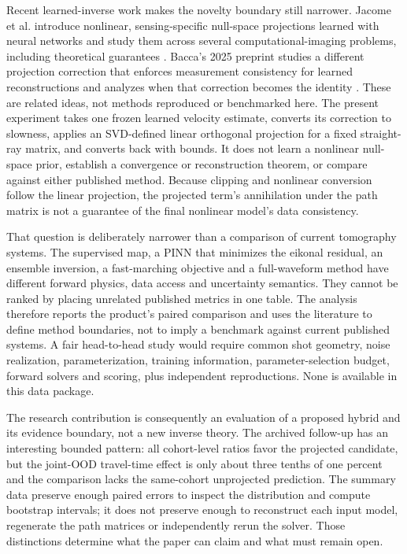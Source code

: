 \documentclass[11pt]{article}
\begin{document}
Recent learned-inverse work makes the novelty boundary still narrower. Jacome et al. introduce nonlinear, sensing-specific null-space projections learned with neural networks and study them across several computational-imaging problems, including theoretical guarantees \cite{jacome_npn_2025}. Bacca's 2025 preprint studies a different projection correction that enforces measurement consistency for learned reconstructions and analyzes when that correction becomes the identity \cite{bacca_projection_2025}. These are related ideas, not methods reproduced or benchmarked here. The present experiment takes one frozen learned velocity estimate, converts its correction to slowness, applies an SVD-defined linear orthogonal projection for a fixed straight-ray matrix, and converts back with bounds. It does not learn a nonlinear null-space prior, establish a convergence or reconstruction theorem, or compare against either published method. Because clipping and nonlinear conversion follow the linear projection, the projected term's annihilation under the path matrix is not a guarantee of the final nonlinear model's data consistency.

That question is deliberately narrower than a comparison of current tomography systems. The supervised map, a PINN that minimizes the eikonal residual, an ensemble inversion, a fast-marching objective and a full-waveform method have different forward physics, data access and uncertainty semantics. They cannot be ranked by placing unrelated published metrics in one table. The analysis therefore reports the product's paired comparison and uses the literature to define method boundaries, not to imply a benchmark against current published systems. A fair head-to-head study would require common shot geometry, noise realization, parameterization, training information, parameter-selection budget, forward solvers and scoring, plus independent reproductions. None is available in this data package.

The research contribution is consequently an evaluation of a proposed hybrid and its evidence boundary, not a new inverse theory. The archived follow-up has an interesting bounded pattern: all cohort-level ratios favor the projected candidate, but the joint-OOD travel-time effect is only about three tenths of one percent and the comparison lacks the same-cohort unprojected prediction. The summary data preserve enough paired errors to inspect the distribution and compute bootstrap intervals; it does not preserve enough to reconstruct each input model, regenerate the path matrices or independently rerun the solver. Those distinctions determine what the paper can claim and what must remain open.
\end{document}
